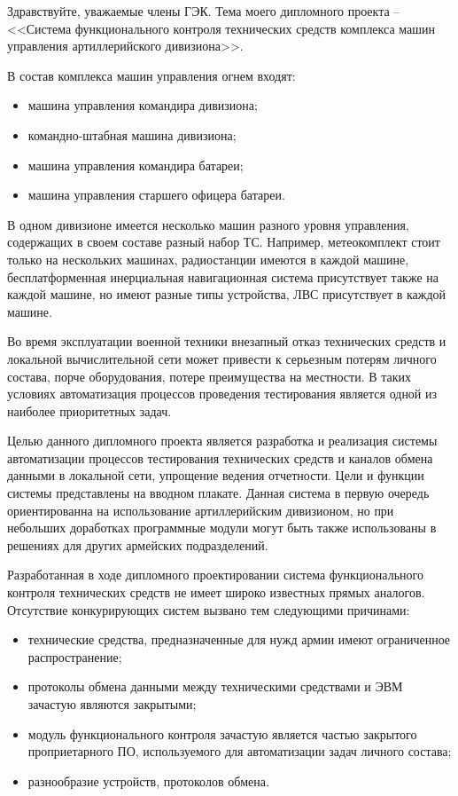 
Здравствуйте, уважаемые члены ГЭК. Тема моего дипломного проекта -- <<Система функционального контроля технических
средств комплекса машин управления артиллерийского дивизиона>>.

В состав комплекса машин управления огнем входят:
\begin{itemize}
	\item машина управления командира дивизиона;
	\item командно-штабная машина дивизиона;
	\item машина управления командира батареи;
	\item машина управления старшего офицера батареи.
\end{itemize}

В одном дивизионе имеется несколько машин разного уровня управления, содержащих в своем
составе разный набор ТС.
Например, метеокомплект стоит только на нескольких машинах, радиостанции имеются в каждой машине, бесплатформенная
инерциальная навигационная система присутствует также на каждой машине, но имеют разные типы устройства,
ЛВС присутствует в каждой машине.

Во время эксплуатации военной техники внезапный отказ технических средств и локальной вычислительной сети может привести
к серьезным потерям личного состава, порче оборудования, потере преимущества на местности.
В таких условиях автоматизация процессов проведения тестирования является одной из наиболее приоритетных задач.

Целью данного дипломного проекта является разработка и реализация системы автоматизации процессов тестирования
технических средств и каналов обмена данными в локальной сети, упрощение ведения отчетности. Цели и функции системы
представлены на вводном плакате.
Данная система в первую очередь ориентированна на использование артиллерийским дивизионом, но при небольших доработках
программные модули могут быть также использованы в решениях для других армейских подразделений.

Разработанная в ходе дипломного проектировании система функционального контроля технических средств не имеет широко
известных прямых аналогов. Отсутствие конкурирующих систем вызвано тем следующими причинами:
\begin{itemize}
	\item технические средства, предназначенные для нужд армии имеют ограниченное распространение;
	\item протоколы обмена данными между техническими средствами и ЭВМ зачастую являются закрытыми;
	\item модуль функционального контроля зачастую является частью закрытого проприетарного ПО, используемого для
		автоматизации задач личного состава;
	\item разнообразие устройств, протоколов обмена.
\end{itemize}

